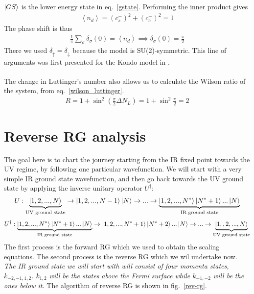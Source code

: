 \documentclass[twoside]{report}
\numberwithin{equation}{section}
\begin{document}
\(\ket{GS}\) is the lower energy state in eq.~\ref{gstate}. Performing the inner product gives
\begin{equation}\begin{aligned}
	\left<n_d \right> = \left( c_s^- \right)^2 + \left( c_c^- \right)^2 = 1
\end{aligned}\end{equation}
The phase shift is thus
\begin{equation}\begin{aligned}
	\frac{1}{\pi}\sum_\sigma \delta_\sigma(0) = \left<n_d \right> \implies \delta_\sigma(0) = \frac{\pi}{2}
\end{aligned}\end{equation}
There we used \(\delta_\uparrow = \delta_\downarrow\) because the model is SU(2)-symmetric. This line of arguments was first presented for the Kondo model in \cite{martin}.
\\\\The change in Luttinger's number also allows us to calculate the Wilson ratio of the system, from eq.~\ref{wilson_luttinger}.
\begin{equation}\begin{aligned}
	R = 1 + \sin^2 \left( \frac{\pi}{2}\Delta N_L \right) = 1 + \sin^2 \frac{\pi}{2} = 2
\end{aligned}\end{equation}
\section{Reverse RG analysis}
The goal here is to chart the journey starting from the IR fixed point towards the UV regime, by following one particular wavefunction. We will start with a very simple IR ground state wavefunction, and then go back towards the UV ground state by applying the inverse unitary operator \(U^\dagger\):
\begin{equation*}\begin{aligned}
	U : \underbrace{\ket{1,2,...,N}}_\text{UV ground state} \rightarrow \ket{1,2,...,N-1}\ket{N} \rightarrow ... \rightarrow \underbrace{\ket{1,2,...,N^*}\ket{N^*+1}...\ket{N}}_\text{IR ground state}
\end{aligned}\end{equation*}
\begin{equation*}\begin{aligned}
	U^\dagger : \underbrace{\ket{1,2,...,N^*}\ket{N^*+1}...\ket{N}}_\text{IR ground state} \rightarrow \ket{1,2,...,N^*+1}\ket{N^*+2}...\ket{N} \rightarrow ... \rightarrow\underbrace{\ket{1,,2,...,N}}_\text{UV ground state}
\end{aligned}\end{equation*}
The first process is the forward RG which we used to obtain the scaling equations. The second process is the reverse RG which we wil undertake now. \textit{The IR ground state we will start with will consist of four momenta states, \(k_{-2, -1, 1 ,2}\). \(k_{1,2}\) will be the states above the Fermi surface while \(k_{-1, -2}\) will be the ones below it.} The algorithm of reverse RG is shown in fig.~\ref{rev-rg}.
\end{document}
